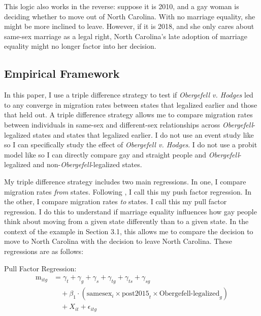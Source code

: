 \documentclass[12pt,letterpaper]{article}
\begin{document}
This logic also works in the reverse: suppose it is 2010, and a gay woman is deciding whether to move out of North Carolina. With no marriage equality, she might be more inclined to leave. However, if it is 2018, and she only cares about same-sex marriage as a legal right, North Carolina’s late adoption of marriage equality might no longer factor into her decision. 

\subsection{Empirical Framework}

In this paper, I use a triple difference strategy to test if \textit{Obergefell v. Hodges} led to any converge in migration rates between states that legalized earlier and those that held out. A triple difference strategy allows me to compare migration rates between individuals in same-sex and different-sex relationships across \textit{Obergefell}-legalized states and states that legalized earlier. I do not use an event study like \citet{1} so I can specifically study the effect of \textit{Obergefell v. Hodges}. I do not use a probit model like \citet{12} so I can directly compare gay and straight people and \textit{Obergefell}-legalized and non-\textit{Obergefell}-legalized states.

My triple difference strategy includes two main regressions. In one, I compare migration rates \textit{from} states. Following \citet{12}, I call this my push factor regression. In the other, I compare migration rates \textit{to} states. I call this my pull factor regression. I do this to understand if marriage equality influences how gay people think about moving from a given state differently than to a given state. In the context of the example in Section 3.1, this allows me to compare the decision to move to North Carolina with the decision to leave North Carolina. These regressions are as follows:


\hfill
\break
Pull Factor Regression:
\begin{equation}
\begin{aligned}
\text{m}_{itg} &= \gamma_t + \gamma_g + \gamma_s + \gamma_{tg} + \gamma_{ts} + \gamma_{sg} \\
&\quad + \beta_1 \cdot (\text{samesex}_i \times \text{post2015}_t \times \text{Obergefell-legalized}_g) \\
&\quad + X_{it} + \epsilon_{itg}
\end{aligned}
\end{equation}
\end{document}
